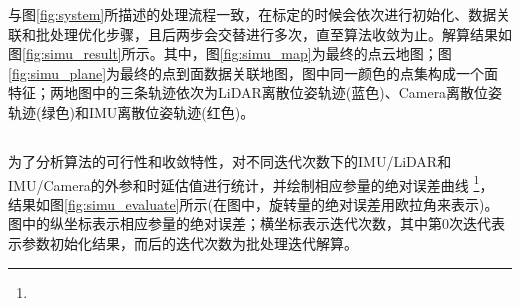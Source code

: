 与图\ref{fig:system}所描述的处理流程一致，在标定的时候会依次进行初始化、数据关联和批处理优化步骤，且后两步会交替进行多次，直至算法收敛为止。解算结果如图\ref{fig:simu_result}所示。其中，图\ref{fig:simu_map}为最终的点云地图；图\ref{fig:simu_plane}为最终的点到面数据关联地图，图中同一颜色的点集构成一个面特征；两地图中的三条轨迹依次为LiDAR离散位姿轨迹(蓝色)、Camera离散位姿轨迹(绿色)和IMU离散位姿轨迹(红色)。

\subsection{}
为了分析算法的可行性和收敛特性，对不同迭代次数下的IMU/LiDAR和IMU/Camera的外参和时延估值进行统计，并绘制相应参量的绝对误差曲线
\footnote{}，
结果如图\ref{fig:simu_evaluate}所示(在图中，旋转量的绝对误差用欧拉角来表示)。	图中的纵坐标表示相应参量的绝对误差；横坐标表示迭代次数，其中第0次迭代表示参数初始化结果，而后的迭代次数为批处理迭代解算。

